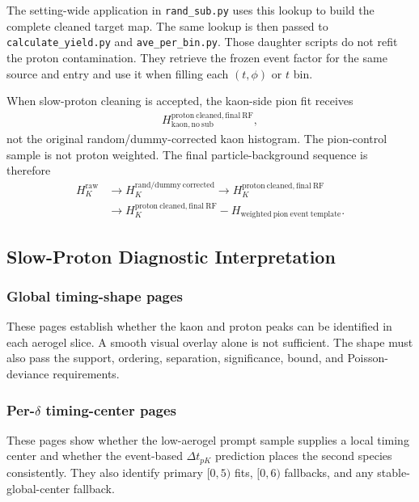 \documentclass[11pt]{article}
\begin{document}
The setting-wide application in \texttt{rand\_sub.py} uses this lookup to build
the complete cleaned target map.  The same lookup is then passed to
\texttt{calculate\_yield.py} and \texttt{ave\_per\_bin.py}.  Those daughter
scripts do not refit the proton contamination.  They retrieve the frozen event
factor for the same source and entry and use it when filling each $(t,\phi)$ or
$t$ bin.

When slow-proton cleaning is accepted, the kaon-side pion fit receives
\begin{align}
  H_{\mathrm{kaon,no\ sub}}^{\mathrm{proton\ cleaned,final\ RF}},
\end{align}
not the original random/dummy-corrected kaon histogram.  The pion-control sample
is not proton weighted.  The final particle-background sequence is therefore
\begin{align}
  H_{K}^{\mathrm{raw}}
  &\longrightarrow
  H_{K}^{\mathrm{rand/dummy\ corrected}}
  \longrightarrow
  H_{K}^{\mathrm{proton\ cleaned,final\ RF}}\\
  &\longrightarrow
  H_{K}^{\mathrm{proton\ cleaned,final\ RF}}
  -H_{\mathrm{weighted\ pion\ event\ template}}.
\end{align}

\subsection{Slow-Proton Diagnostic Interpretation}

\subsubsection*{Global timing-shape pages}

These pages establish whether the kaon and proton peaks can be identified in
each aerogel slice.  A smooth visual overlay alone is not sufficient.  The
shape must also pass the support, ordering, separation, significance, bound, and
Poisson-deviance requirements.

\subsubsection*{Per-$\delta$ timing-center pages}

These pages show whether the low-aerogel prompt sample supplies a local timing
center and whether the event-based $\Delta t_{pK}$ prediction places the second
species consistently.  They also identify primary $[0,5)$ fits, $[0,6)$
fallbacks, and any stable-global-center fallback.
\end{document}

